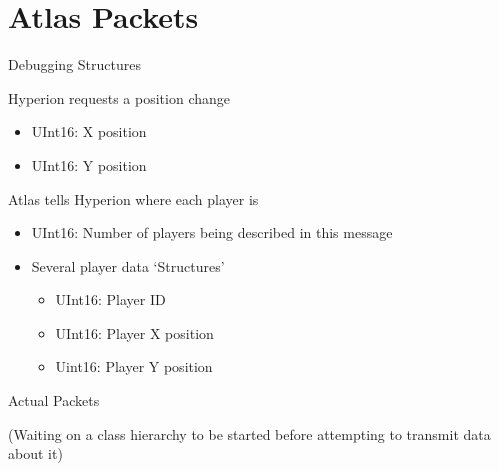 \documentclass[10pt,a4paper]{scrreprt}
\begin{document}
	\section{Atlas Packets}
	\begin{description}[leftmargin=!,labelwidth=0.35\textwidth, itemsep=2ex]
		\item \begin{Large} Debugging Structures \end{Large}
		\item[Request Position Change]
			Hyperion requests a position change
			\begin{itemize}
				\item UInt16: X position
				\item UInt16: Y position
			\end{itemize}	
		\item[Update Positions]	
			Atlas tells Hyperion where each player is
			\begin{itemize}
				\item UInt16: Number of players being described in this message
				\item Several player data `Structures'
					\begin{itemize}
						\item UInt16: Player ID
						\item UInt16: Player X position
						\item Uint16: Player Y position
					\end{itemize}
			\end{itemize}
		\item \begin{Large} Actual Packets \end{Large}
		\item (Waiting on a class hierarchy to be started before attempting to transmit data about it)
	\end{description}
\end{document}
